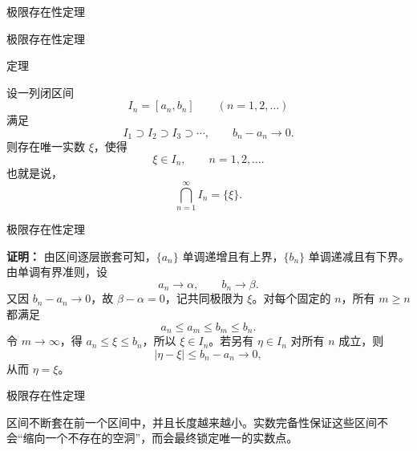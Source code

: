 \documentclass[aspectratio=169,10pt,fontset=fandol]{ctexbeamer}
\begin{document}
\begin{frame}[t,fragile]{极限存在性定理}
\footnotesize
{\footnotesize



\iffalse


}
\end{frame}
\begin{frame}[t,fragile]{极限存在性定理}
\footnotesize
\begin{block}{定理}
{\footnotesize

设一列闭区间
\[
I_n=[a_n,b_n]\qquad(n=1,2,\ldots)
\]
满足
\[
I_1\supset I_2\supset I_3\supset\cdots,
\qquad b_n-a_n\to0.
\]
则存在唯一实数 \(\xi\)，使得
\[
\xi\in I_n,\qquad n=1,2,\ldots.
\]
也就是说，
\[
\bigcap_{n=1}^{\infty}I_n=\{\xi\}.
\]

}
\end{block}
\end{frame}
\begin{frame}[t,fragile]{极限存在性定理}
\footnotesize
{\footnotesize
\textbf{证明：}
由区间逐层嵌套可知，\(\{a_n\}\) 单调递增且有上界，\(\{b_n\}\) 单调递减且有下界。由单调有界准则，设
\[
a_n\to\alpha,\qquad b_n\to\beta.
\]
又因 \(b_n-a_n\to0\)，故 \(\beta-\alpha=0\)，记共同极限为 \(\xi\)。对每个固定的 \(n\)，所有 \(m\ge n\) 都满足
\[
a_n\le a_m\le b_m\le b_n.
\]
令 \(m\to\infty\)，得 \(a_n\le\xi\le b_n\)，所以 \(\xi\in I_n\)。若另有 \(\eta\in I_n\) 对所有 \(n\) 成立，则
\[
|\eta-\xi|\le b_n-a_n\to0,
\]
从而 \(\eta=\xi\)。

}
\end{frame}
\begin{frame}[t,fragile]{极限存在性定理}
\footnotesize
{\footnotesize
区间不断套在前一个区间中，并且长度越来越小。实数完备性保证这些区间不会“缩向一个不存在的空洞”，而会最终锁定唯一的实数点。
\begin{center}
\end{center}

}
\end{frame}
\end{document}
